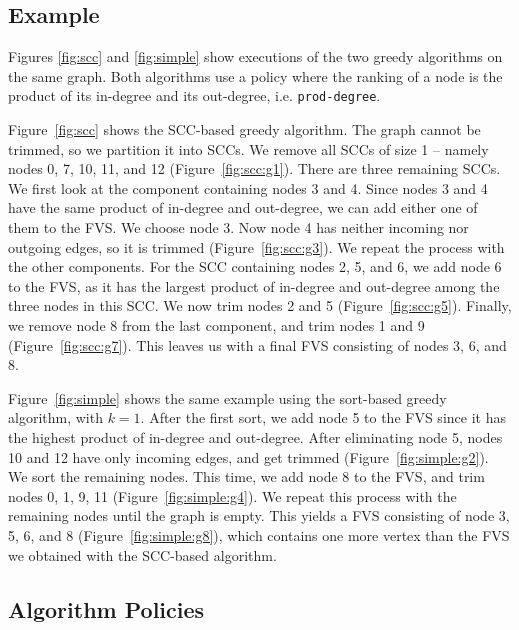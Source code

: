 \subsection{Example}\label{subsec:alg_example}





Figures \ref{fig:scc} and \ref{fig:simple} show executions of the two greedy algorithms on the same graph. Both algorithms use a policy where the ranking of a node is the product of its in-degree and its out-degree, i.e. \texttt{prod-degree}.

Figure~\ref{fig:scc} shows the SCC-based greedy algorithm. The graph cannot be trimmed, so we partition it into SCCs. We remove all SCCs of size 1 -- namely nodes 0, 7, 10, 11, and 12 (Figure~\ref{fig:scc:g1}). There are three remaining SCCs. We first look at the component containing nodes 3 and 4. Since nodes 3 and 4 have the same product of in-degree and out-degree, we can add either one of them to the FVS. We choose node 3. Now node 4 has neither incoming nor outgoing edges, so it is trimmed (Figure~\ref{fig:scc:g3}). We repeat the process with the other components. For the SCC containing nodes 2, 5, and 6, we add node 6 to the FVS, as it has the largest product of in-degree and out-degree among the three nodes in this SCC. We now trim nodes 2 and 5 (Figure~\ref{fig:scc:g5}). Finally, we remove node 8 from the last component, and trim nodes 1 and 9 (Figure~\ref{fig:scc:g7}). This leaves us with a final FVS consisting of nodes 3, 6, and 8.

Figure~\ref{fig:simple} shows the same example using the sort-based greedy algorithm, with $k = 1$. After the first sort, we add node 5 to the FVS since it has the highest product of in-degree and out-degree. After eliminating node 5, nodes 10 and 12 have only incoming edges, and get trimmed (Figure~\ref{fig:simple:g2}). We sort the remaining nodes. This time, we add node 8 to the FVS, and trim nodes 0, 1, 9, 11 (Figure~\ref{fig:simple:g4}). We repeat this process with the remaining nodes until the graph is empty. This yields a FVS consisting of node 3, 5, 6, and 8 (Figure~\ref{fig:simple:g8}), which contains one more vertex than the FVS we obtained with the SCC-based algorithm.


\subsection{Algorithm Policies}
\label{subsec:validator_reordering:policy}

